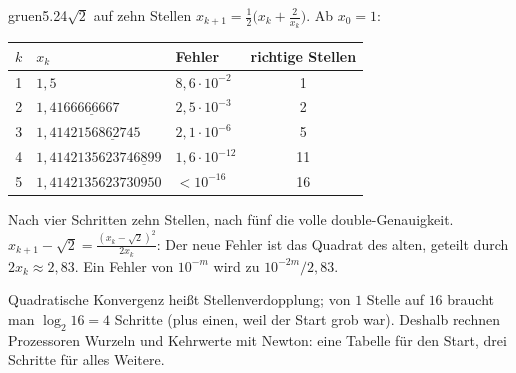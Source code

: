 \begin{loesungkarte}{gruen}{5.24}{$\sqrt2$ auf zehn Stellen}
$x_{k+1} = \frac12\bigl(x_k + \frac2{x_k}\bigr)$. Ab $x_0 = 1$:
\begin{center}\small
\begin{tabular}{c|l|l|c}
$k$ & $x_k$ & Fehler & richtige Stellen\\ \hline
1 & $1{,}5$ & $8{,}6\cdot10^{-2}$ & 1\\
2 & $1{,}41\underline{66666667}$ & $2{,}5\cdot10^{-3}$ & 2\\
3 & $1{,}41421\underline{56862745}$ & $2{,}1\cdot10^{-6}$ & 5\\
4 & $1{,}41421356237\underline{46899}$ & $1{,}6\cdot10^{-12}$ & 11\\
5 & $1{,}4142135623730950$ & $< 10^{-16}$ & 16
\end{tabular}
\end{center}
Nach vier Schritten zehn Stellen, nach fünf die volle double-Genauigkeit.
$x_{k+1} - \sqrt2 = \frac{(x_k - \sqrt2)^{2}}{2x_k}$: Der neue Fehler ist das Quadrat des alten, geteilt durch $2x_k\approx2{,}83$. Ein Fehler von $10^{-m}$ wird zu $10^{-2m}/2{,}83$.
\begin{mitnehmen}\kastentext
Quadratische Konvergenz heißt Stellenverdopplung; von $1$ Stelle auf $16$ braucht man $\log_2 16 = 4$ Schritte (plus einen, weil der Start grob war). Deshalb rechnen Prozessoren Wurzeln und Kehrwerte mit Newton: eine Tabelle für den Start, drei Schritte für alles Weitere.
\end{mitnehmen}
\end{loesungkarte}

